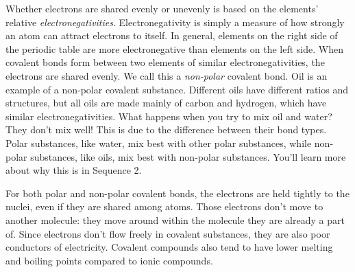 Whether electrons are shared evenly or unevenly is based on the elements' relative 
\textit{electronegativities}. Electronegativity is simply
a measure of how strongly an atom can attract electrons to itself. In general, 
elements on the right side of the periodic table are more electronegative than 
elements on the left side. When covalent bonds form between two elements of similar electronegativities, the electrons are shared evenly. We call this a \textit{non-polar}
covalent bond. Oil is an example of a non-polar covalent substance. Different 
oils have different ratios and structures, but all oils are made mainly of carbon 
and hydrogen, which have similar electronegativities. What happens when you try to 
mix oil and water? They don't mix well! This is due to the difference between 
their bond types. Polar substances, like water, mix best with other polar 
substances, while non-polar substances, like oils, mix best with non-polar 
substances. You'll learn more about why this is in Sequence 2.

For both polar and non-polar covalent bonds, the electrons are held tightly to 
the nuclei, even if they are shared among atoms. Those electrons don't move to 
another molecule: they move around within the molecule they are already a part 
of. Since electrons don't flow freely in covalent substances, they are also poor 
conductors of electricity. Covalent compounds also tend to have lower melting and 
boiling points compared to ionic compounds. 

